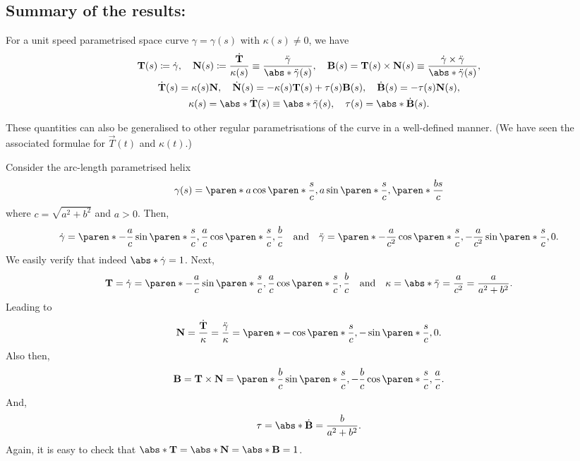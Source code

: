\documentclass[11pt]{penrose}
\newcommand{\vT}{\vec{T}}
\newcommand{\vN}{\vec{N}}
\newcommand{\vB}{\vec{B}}
\begin{document}
\subsection*{Summary of the results:}
For a unit speed parametrised space curve $\gamma = \gamma(s)$ with $\kappa(s) \neq 0$, we have
\begin{gather*}
    \vT(s) \coloneq \dot{\gamma},
    \quad
    \vN(s) \coloneq \frac{\dot{\vT}}{\kappa(s)} \equiv \frac{\ddot{\gamma}}{\abs*{\ddot{\gamma}(s)}},
    \quad
    \vB(s) = \vT(s) \times \vN(s) \equiv \frac{\dot{\gamma} \times \ddot{\gamma}}{\abs*{\ddot{\gamma}(s)}},\\
    \dot{\vT}(s) = \kappa(s) \vN,
    \quad
    \dot{\vN}(s) = -\kappa(s) \vT(s) + \tau(s) \vB(s),
    \quad
    \dot{\vB}(s) = - \tau(s) \vN(s),\\
    \kappa(s) = \abs*{\dot{\vT}(s)} \equiv \abs*{\ddot{\gamma}(s)},
    \quad
    \tau(s) = \abs*{\dot{\vB}(s)}.
\end{gather*}

These quantities can also be generalised to other regular parametrisations of the curve in a well-defined manner. (We have seen the associated formulae for $\vT(t)$ and $\kappa(t)$.)

\begin{negg}
    Consider the arc-length parametrised helix
    \begin{equation}
        \gamma(s) = \paren*{ a \cos\paren*{\frac{s}{c}}, a\sin\paren*{\frac{s}{c}}, \paren*{\frac{bs}{c}} }
    \end{equation}
    where $c = \sqrt{a^2 + b^2}$ and $a > 0$. Then,
    \begin{equation}
        \dot{\gamma} = \paren*{ -\frac{a}{c} \sin\paren*{\frac{s}{c}}, \frac{a}{c} \cos\paren*{\frac{s}{c}}, \frac{b}{c} }
        \quad\text{and}\quad
        \ddot{\gamma} = \paren*{ -\frac{a}{c^2} \cos\paren*{\frac{s}{c}}, -\frac{a}{c^2} \sin\paren*{\frac{s}{c}}, 0 }.
    \end{equation}
    We easily verify that indeed $\abs*{\dot{\gamma}} = 1$. Next,
    \begin{equation}
        \vT
        = \dot{\gamma}
        = \paren*{ -\frac{a}{c} \sin\paren*{\frac{s}{c}}, \frac{a}{c} \cos\paren*{\frac{s}{c}}, \frac{b}{c} }
        \quad\text{and}\quad
        \kappa = \abs*{\ddot{\gamma}} = \frac{a}{c^2} = \frac{a}{a^2 + b^2}.
    \end{equation}
    Leading to
    \begin{equation}
        \vN = \frac{\dot{\vT}}{\kappa} = \frac{\ddot{\gamma}}{\kappa} = \paren*{ -\cos\paren*{\frac{s}{c}}, -\sin\paren*{\frac{s}{c}}, 0 }.
    \end{equation}
    Also then,
    \begin{equation}
        \vB
        = \vT \times \vN
        = \paren*{ \frac{b}{c}\sin\paren*{\frac{s}{c}}, -\frac{b}{c}\cos\paren*{\frac{s}{c}}, \frac{a}{c} }.
    \end{equation}
    And,
    \begin{equation}
        \tau = \abs*{\dot{\vB}} = \frac{b}{a^2 + b^2}.
    \end{equation}
    Again, it is easy to check that $\abs*{\vT} = \abs*{\vN} = \abs*{\vB} = 1$.
\end{negg}
\end{document}
